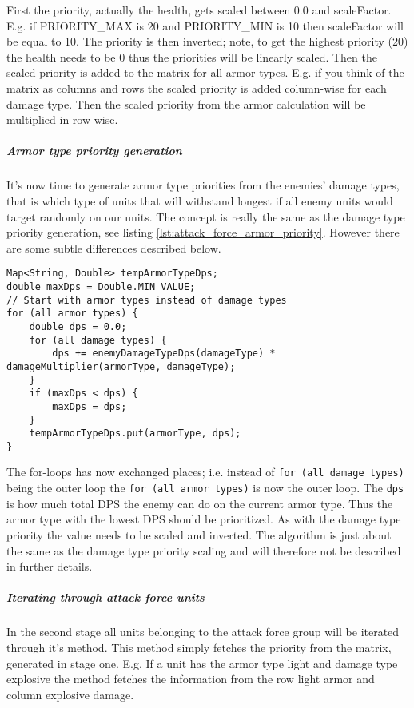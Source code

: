 First the priority, actually the health, gets scaled between 0.0 and scaleFactor. E.g. if
PRIORITY\_MAX is 20 and PRIORITY\_MIN is 10 then scaleFactor will be equal to 10. The priority is
then inverted; note, to get the highest priority (20) the health needs to be 0 thus the priorities
will be linearly scaled. Then the scaled priority is added to the matrix for all armor types. E.g.
if you think of the matrix as columns and rows the scaled priority is added column-wise for each
damage type. Then the scaled priority from the armor calculation will be multiplied in row-wise.

\subparagraph{Armor type priority generation}
It's now time to generate armor type priorities from the enemies' damage types, that is which type
of units that will withstand longest if all enemy units would target randomly on our units. The
concept is really the same as the damage type priority generation, see listing
\ref{lst:attack_force_armor_priority}. However there are some subtle differences described below.

\begin{lstfloat}
\begin{lstlisting}[caption={Armor Type Priority},label={lst:attack_force_armor_priority}]
Map<String, Double> tempArmorTypeDps;
double maxDps = Double.MIN_VALUE;
// Start with armor types instead of damage types
for (all armor types) {
	double dps = 0.0;
	for (all damage types) {
		dps += enemyDamageTypeDps(damageType) * damageMultiplier(armorType, damageType);
	}
	if (maxDps < dps) {
		maxDps = dps;
	}
	tempArmorTypeDps.put(armorType, dps);
}
\end{lstlisting}
\end{lstfloat}

The for-loops has now exchanged places; i.e. instead of \texttt{for (all damage types)} being
the outer loop the \texttt{for (all armor types)} is now the outer loop. The \texttt{dps} is how
much total DPS the enemy can do on the current armor type. Thus the armor type with the lowest DPS should be
prioritized. As with the damage type priority the value needs to be scaled and inverted. The
algorithm is just about the same as the damage type priority scaling and will therefore not be
described in further details.

\subparagraph{Iterating through attack force units}
In the second stage all units belonging to the attack force group will be iterated through it's
method. This method simply fetches the priority from the matrix, generated in stage one. E.g. If a
unit has the armor type light and damage type explosive the method fetches the information from the
row light armor and column explosive damage.

